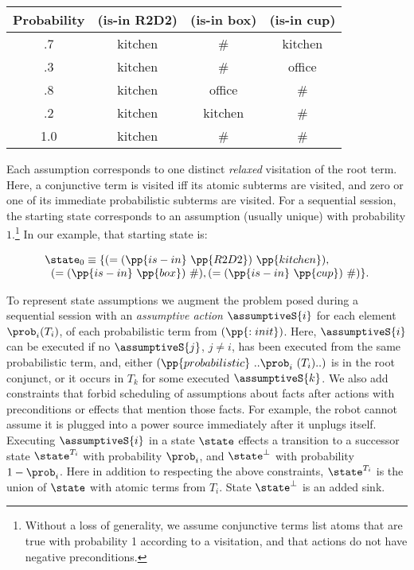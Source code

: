 \tiny
\begin{tabular}{cccc}
\hline
Probability & (is-in R2D2)  & (is-in box)  & (is-in cup) \\
\hline
.7 & kitchen & \# &  kitchen\\
.3 & kitchen & \# & office \\
.8 & kitchen & office & \# \\
.2 & kitchen & kitchen & \# \\
1.0 & kitchen & \# & \# \\
\hline
\end{tabular}
\normalsize

\noindent Each assumption corresponds to one distinct {\em
relaxed} visitation of the root term. Here, a conjunctive term is
visited iff its atomic subterms are visited, and zero or one of its
immediate probabilistic subterms are visited. For a sequential
session, the starting state corresponds to an assumption (usually
unique) with probability $1$.\footnote{Without a loss of generality,
we assume conjunctive terms list atoms that are true with
probability 1 according to a visitation, and that actions do not
have negative preconditions.}  In our example, that starting state is:

\vspace{-1ex}

\tiny
\[
\begin{array}{l}
\state_0 \equiv \{(=(\pp{is-in}~\pp{R2D2})~\pp{kitchen}),\\
\;\;(=(\pp{is-in}~\pp{box})~\#), (=(\pp{is-in}~\pp{cup})~\#)\}.
\end{array}
\]
\normalsize

\vspace{-1ex}

To represent state assumptions we augment the problem posed during
a sequential session with an \emph{assumptive action} $\assumptiveS{i}$ for
each element $\prob_i (T_i)$, of each probabilistic term from
$(\pp{:init})$. Here, $\assumptiveS{i}$ can be executed if no
$\assumptiveS{j}$, $j \neq i$, has been executed from the same
probabilistic term, and, either
$(\pp{probabilistic}~..\prob_i~(T_i)..)$ is in the root conjunct, or
it occurs in $T_k$ for some executed $\assumptiveS{k}$.
We also add constraints that forbid scheduling of
assumptions about facts after actions with preconditions or effects
that mention those facts. For example, the robot cannot assume it is
plugged into a power source immediately after it unplugs itself.
Executing $\assumptiveS{i}$ in a state $\state$ effects a transition
to a successor state $\state^{T_i}$ with probability $\prob_i$, and
$\state^\bot$ with probability $1 - \prob_i$. Here in addition to
respecting the above constraints, $\state^{T_i}$ is the union of
$\state$ with atomic terms from $T_i$. State $\state^\bot$ is an added
sink.


